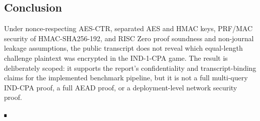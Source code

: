 \subsection{Conclusion}

Under nonce-respecting AES-CTR, separated AES and HMAC keys, PRF/MAC security of
HMAC-SHA256-192, and RISC Zero proof soundness and non-journal leakage
assumptions, the public transcript does not reveal which equal-length challenge
plaintext was encrypted in the IND-1-CPA game. The result is deliberately
scoped: it supports the report's confidentiality and transcript-binding claims
for the implemented benchmark pipeline, but it is not a full multi-query
IND-CPA proof, a full AEAD proof, or a deployment-level network security proof.

\hfill \(\rule{0.8ex}{0.8ex}\)
